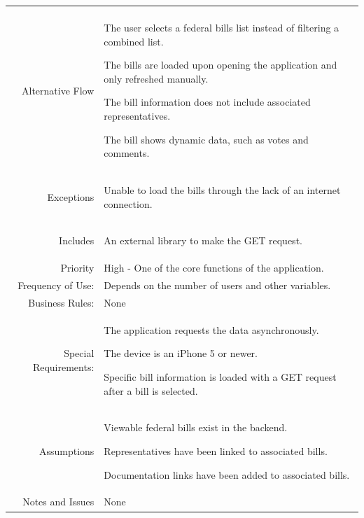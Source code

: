 \documentclass[12pt,oneside,letterpaper]{article}
\newenvironment{packed_enumerate}{
\begin{minipage}[t]{\linewidth}\begin{compactenum}[after=\strut]}
{\end{compactenum}\end{minipage}}
\begin{document}
\begin{longtable}{|r|p{3.8in}|}
\begin{packed_enumerate}
\end{packed_enumerate}\\
Alternative Flow&
\begin{packed_enumerate}
\item The user selects a federal bills list instead of filtering a combined list.
\item The bills are loaded upon opening the application and only refreshed manually.
\item The bill information does not include associated representatives.
\item The bill shows dynamic data, such as votes and comments.
\end{packed_enumerate}\\
Exceptions&
\begin{packed_enumerate}
\item Unable to load the bills through the lack of an internet connection.
\end{packed_enumerate}\\
Includes&
\begin{packed_enumerate}
\item An external library to make the GET request.
\end{packed_enumerate}\\
Priority&High - One of the core functions of the application.\\
Frequency of Use:&Depends on the number of users and other variables.\\
Business Rules:&None\\
Special Requirements:&
\begin{packed_enumerate}
\item The application requests the data asynchronously.
\item The device is an iPhone 5 or newer.
\item Specific bill information is loaded with a GET request after a bill is selected.
\end{packed_enumerate}\\
Assumptions&
\begin{packed_enumerate}
\item Viewable federal bills exist in the backend.
\item Representatives have been linked to associated bills.
\item Documentation links have been added to associated bills.
\end{packed_enumerate}\\
Notes and Issues&None\\
\hline
\end{longtable}
\end{document}
